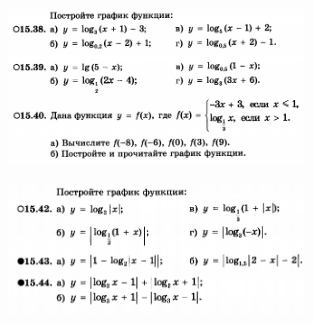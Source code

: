 
\begin{figure}[h!]
	\centering
	\includegraphics[width=0.7\textwidth]{img/log_t1.png}
\end{figure}

\begin{figure}[h!]
	\centering
	\includegraphics[width=0.7\textwidth]{img/log_t2.png}
\end{figure}